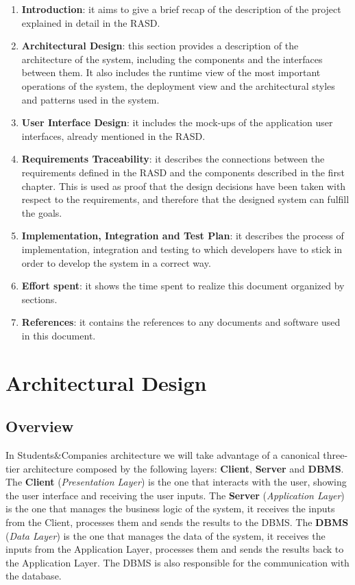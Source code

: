 \documentclass{article}
\begin{document}
\begin{enumerate}
    \item \textbf{Introduction}: it aims to give a brief recap of the description of the project explained in detail in the RASD.
    \item \textbf{Architectural Design}: this section provides a description of the architecture of the system, including the components and the interfaces between them. It also includes the runtime view of the most important operations of the system, the deployment view and the architectural styles and patterns used in the system.
    \item \textbf{User Interface Design}: it includes the mock-ups of the application user interfaces, already mentioned in the RASD.
    \item \textbf{Requirements Traceability}: it describes the connections between the requirements defined in the RASD and the components described in the first chapter. This is used as proof that the design decisions have been taken with respect to the requirements, and therefore that the designed system can fulfill the goals.
    \item \textbf{Implementation, Integration and Test Plan}: it describes the process of implementation, integration and testing to which developers have to stick in order to develop the system in a correct way.
    \item \textbf{Effort spent}: it shows the time spent to realize this document organized by sections.
    \item \textbf{References}: it contains the references to any documents and software used in this document.
\end{enumerate}

\newpage

\section{Architectural Design}

\subsection{Overview}

In Students\&Companies architecture we will take advantage of a canonical three-tier architecture composed by the following layers: \textbf{Client}, \textbf{Server} and \textbf{DBMS}. The \textbf{Client} (\textit{Presentation Layer}) is the one that interacts with the user, showing the user interface and receiving the user inputs. The \textbf{Server} (\textit{Application Layer}) is the one that manages the business logic of the system, it receives the inputs from the Client, processes them and sends the results to the DBMS. The \textbf{DBMS} (\textit{Data Layer}) is the one that manages the data of the system, it receives the inputs from the Application Layer, processes them and sends the results back to the Application Layer. The DBMS is also responsible for the communication with the database.
\end{document}
